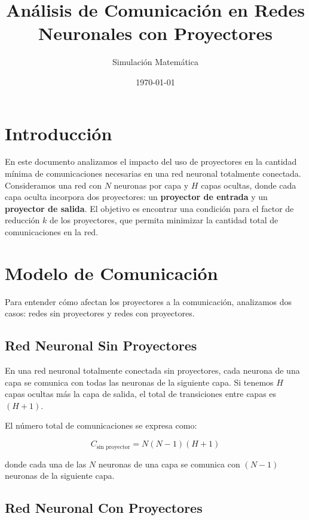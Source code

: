 \documentclass{article}
\begin{document}
\title{Análisis de Comunicación en Redes Neuronales con Proyectores}
\author{Simulación Matemática}
\date{\today}
\maketitle

\section{Introducción}

En este documento analizamos el impacto del uso de proyectores en la cantidad mínima de comunicaciones necesarias en una 
red neuronal totalmente conectada. Consideramos una red con \( N \) neuronas por capa y \( H \) capas ocultas,
donde cada capa oculta incorpora dos proyectores: un \textbf{proyector de entrada} y un \textbf{proyector de salida}. 
El objetivo es encontrar una condición para el factor de reducción \( k \) de los proyectores, que permita minimizar 
la cantidad total de comunicaciones en la red.

\section{Modelo de Comunicación}

Para entender cómo afectan los proyectores a la comunicación, analizamos dos casos: redes sin proyectores y redes con proyectores.

\subsection{Red Neuronal Sin Proyectores}

En una red neuronal totalmente conectada sin proyectores, cada neurona de una capa se comunica con todas las neuronas de la 
siguiente capa. Si tenemos \( H \) capas ocultas más la capa de salida, el total de transiciones entre capas es \( (H+1) \).

El número total de comunicaciones se expresa como:

\begin{equation}
C_{\text{sin proyector}} = N (N-1) (H+1)
\end{equation}

donde cada una de las \( N \) neuronas de una capa se comunica con \( (N-1) \) neuronas de la siguiente capa.

\subsection{Red Neuronal Con Proyectores}
\end{document}

